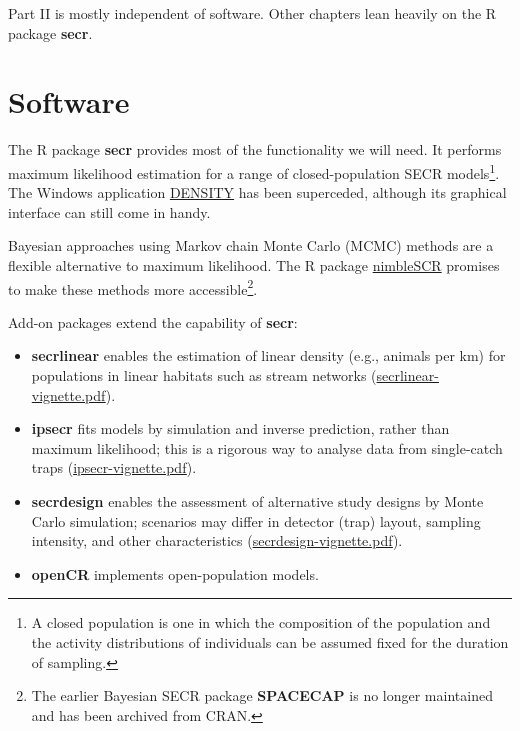 \documentclass[
]{book}
\providecommand{\tightlist}{%
  \setlength{\itemsep}{0pt}\setlength{\parskip}{0pt}}
\begin{document}
Part II is mostly independent of software. Other chapters lean heavily on the R package \textbf{secr}.

\section*{Software}\label{software}

The R package \textbf{secr} \citep{R-secr} provides most of the functionality we will need.
It performs maximum likelihood estimation for a range of closed-population SECR models\footnote{A closed population is one in which the composition of the population and the activity distributions of individuals can be assumed fixed for the duration of sampling.}. The Windows application \href{https://www.otago.ac.nz/density/}{DENSITY} \citep{edr04} has been superceded, although its graphical interface can still come in handy.

Bayesian approaches using Markov chain Monte Carlo (MCMC) methods are a flexible alternative to maximum likelihood. The R package \href{https://CRAN.R-project.org/package=nimbleSCR}{nimbleSCR} promises to make these methods more accessible\footnote{The earlier Bayesian SECR package \textbf{SPACECAP} \citep{SPACECAP} is no longer maintained and has been archived from CRAN.}.

Add-on packages extend the capability of \textbf{secr}:

\begin{itemize}
\tightlist
\item
  \textbf{secrlinear} enables the estimation of linear density (e.g., animals per km) for populations in linear habitats such as stream networks (\href{https://CRAN.R-project.org/package=secrlinear/vignettes/secrlinear-vignette.pdf}{secrlinear-vignette.pdf}).
\item
  \textbf{ipsecr} fits models by simulation and inverse prediction, rather than maximum likelihood; this is a rigorous way to analyse data from single-catch traps (\href{https://CRAN.R-project.org/package=ipsecr/vignettes/ipsecr-vignette.pdf}{ipsecr-vignette.pdf}).
\item
  \textbf{secrdesign} enables the assessment of alternative study designs by Monte Carlo simulation; scenarios may differ in detector (trap) layout, sampling intensity, and other characteristics (\href{https://www.otago.ac.nz/density/pdfs/secrdesign-vignette.pdf\%5D}{secrdesign-vignette.pdf}).
\item
  \textbf{openCR} \citep{es20} implements open-population models.
\end{itemize}
\end{document}
